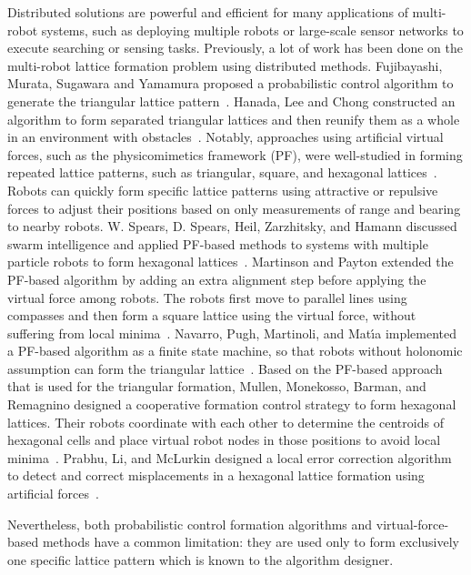 Distributed solutions are powerful and efficient for many applications of multi-robot systems,
such as deploying multiple robots or large-scale sensor networks to execute searching or sensing tasks. 
%
Previously, a lot of work has been done on the multi-robot lattice formation
problem using distributed methods. 
%
Fujibayashi, Murata, Sugawara and Yamamura proposed a probabilistic control algorithm to generate the triangular lattice pattern~\cite{FujMurSugYam02}. 
%
Hanada, Lee and Chong constructed an algorithm to form separated triangular lattices and then reunify
them as a whole in an environment with obstacles~\cite{HanLeeCho07}.  
%
Notably, approaches using artificial virtual forces, such as the physicomimetics framework (PF), 
were well-studied in forming repeated lattice patterns, such as
triangular, square, and hexagonal lattices~\cite{FujMurSugYam02, HanLeeCho07,
  SpeSpeHamHei04, SpeHeiZar05, MarPay2005, NavPugMarMat09, LeeBecFekKroMcL14,
  PraLiMcLu12, MulMonBarRem13}. 
%  
Robots can quickly form specific lattice patterns using attractive or repulsive forces to adjust their positions based on only measurements of range and bearing to nearby robots.  
%
W. Spears, D. Spears, Heil, Zarzhitsky, and Hamann discussed swarm intelligence and applied PF-based
methods to systems with multiple particle robots to form hexagonal lattices~\cite{SpeSpeHamHei04}.  
%
Martinson and Payton extended the PF-based algorithm by adding an extra alignment step before applying the virtual force among robots.  
%
The robots first move to parallel lines using compasses and then form a square lattice using 
the virtual force, without suffering from local minima~\cite{MarPay2005}.  
%
Navarro, Pugh, Martinoli, and Mat{\'\i}a implemented a PF-based algorithm as a finite state machine, 
so that robots without holonomic assumption can form the triangular lattice~\cite{NavPugMarMat09}.  
%
Based on the PF-based approach that is used for the triangular formation, 
Mullen, Monekosso, Barman, and Remagnino designed a cooperative formation control strategy to form hexagonal lattices. 
%
Their robots coordinate with each other to determine the centroids of hexagonal cells and place
virtual robot nodes in those positions to avoid local minima~\cite{MulMonBarRem13}. 
%
Prabhu, Li, and McLurkin designed a local error correction algorithm to detect and correct misplacements in a hexagonal lattice formation using artificial forces~\cite{PraLiMcLu12}.


Nevertheless, both probabilistic control formation algorithms 
and virtual-force-based methods have a common limitation: 
they are used only to form exclusively one specific lattice
pattern which is known to the algorithm designer.


